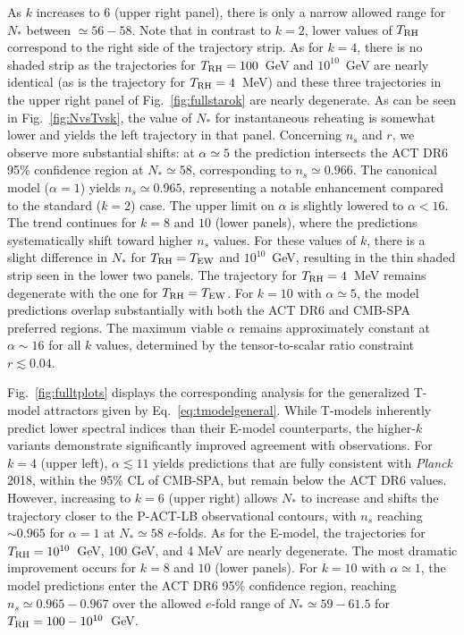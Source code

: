 \documentclass[aps,prev,twocolumn,preprintnumbers,floatfix,nofootinbib]{revtex4-1}
\newcommand{\trh}{T_{\rm RH}}
\begin{document}
As $k$ increases to $6$ (upper right panel), 
there is only a narrow allowed range for  $N_*$ between $\simeq 56 - 58$. Note that in contrast to $k=2$, lower values of $\trh$ correspond to the right side of the trajectory strip. As for $k =4$, there is no shaded strip as the trajectories for  $\trh = 100$~GeV and $10^{10}$~GeV are nearly identical (as is the trajectory for $\trh = 4$~MeV) and these three trajectories in the upper right panel of Fig.~\ref{fig:fullstarok} are nearly degenerate. As can be seen in Fig.~\ref{fig:NvsTvsk}, the value of $N_*$ for instantaneous reheating is somewhat lower and yields the left trajectory  in that panel.   Concerning $n_s$ and $r$, we observe more substantial shifts: at $\alpha \simeq 5$ the prediction intersects the ACT DR6 95\% confidence region at $N_* \simeq 58$, corresponding to $n_s \simeq 0.966$. The canonical model ($\alpha = 1$) yields $n_s \simeq  0.965$, representing a notable enhancement compared to the standard ($k=2$) case. The upper limit on $\alpha$ is slightly lowered to $\alpha < 16$. The trend continues for $k = 8$ and $10$ (lower panels), where the predictions systematically shift toward higher $n_s$ values. For these values of $k$, there is a slight difference in $N_*$ for $\trh = T_{\rm EW}$ and $10^{10}$~GeV, resulting in the thin shaded strip seen in the lower two panels. The trajectory for $\trh = 4$~MeV remains degenerate with the one for $\trh = T_{\rm EW}$. For $k = 10$ with $\alpha \simeq 5$, the model predictions overlap substantially with both the ACT DR6 and CMB-SPA preferred regions. The maximum viable $\alpha$ remains approximately constant at $\alpha \sim 16$ for all $k$ values, determined by the tensor-to-scalar ratio constraint $r \lesssim 0.04$. 

Fig.~\ref{fig:fulltplots} displays the corresponding analysis for the generalized T-model attractors given by Eq.~\eqref{eq:tmodelgeneral}. While T-models inherently predict lower spectral indices than their E-model counterparts, the higher-$k$ variants demonstrate significantly improved agreement with observations. For $k = 4$ (upper left), $\alpha \lesssim 11$ yields predictions that  are fully consistent with {\it Planck} 2018, within the 95\% CL of CMB-SPA, but
remain below the ACT DR6 values.
However, increasing to $k = 6$ (upper right) allows $N_*$ to increase and shifts the trajectory closer to the P-ACT-LB observational contours, with $n_s$ reaching $\sim 0.965$ for $\alpha = 1$ at $N_*\simeq 58$ $e$-folds. As for the E-model, the trajectories for $\trh = 10^{10}$~GeV, 100 GeV, and 4 MeV are nearly degenerate. The most dramatic improvement occurs for $k = 8$ and $10$ (lower panels). For $k = 10$ with $\alpha \simeq 1$, the model predictions enter the ACT DR6 95\% confidence region, reaching $n_s \simeq 0.965-0.967$ over the allowed $e$-fold range of $N_* \simeq 59 -61.5$ for $\trh = 100 - 10^{10}$~GeV.
\end{document}
